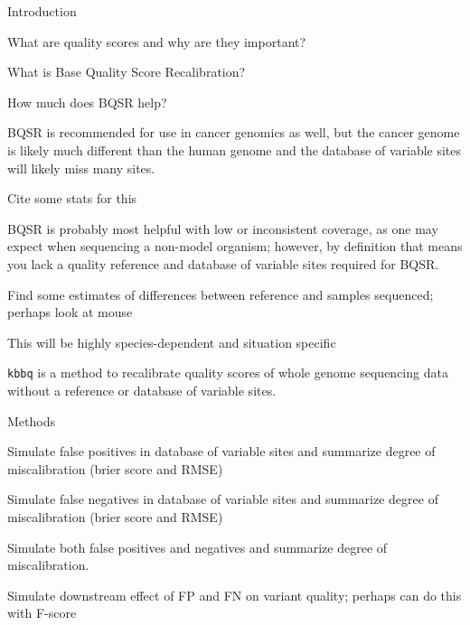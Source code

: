\documentclass{article}
\begin{document}
\linenumbers
\begin{outline}
	\item Introduction
	\begin{outline}
		\item What are quality scores and why are they important?
		\item What is Base Quality Score Recalibration?
		\item How much does BQSR help?
		\begin{outline}
			\item BQSR is recommended for use in cancer genomics as well, but the cancer genome is likely much different than the human genome and the database of variable sites will likely miss many sites.
			\begin{outline}
				\item Cite some stats for this
			\end{outline}
		\end{outline}
		\item BQSR is probably most helpful with low or inconsistent coverage, as one may expect when sequencing a non-model organism; however, by definition that means you lack a quality reference and database of variable sites required for BQSR.
			\begin{outline}
				\item Find some estimates of differences between reference and samples sequenced; perhaps look at mouse
				\item This will be highly species-dependent and situation specific
			\end{outline}
		\item \texttt{kbbq} is a method to recalibrate quality scores of whole genome sequencing data without a reference or database of variable sites.
	\end{outline}
	\item Methods
	\begin{outline}
		\item Simulate false positives in database of variable sites and summarize degree of miscalibration (brier score and RMSE)
		\item Simulate false negatives in database of variable sites and summarize degree of miscalibration (brier score and RMSE)
		\item Simulate both false positives and negatives and summarize degree of miscalibration.
		\item Simulate downstream effect of FP and FN on variant quality; perhaps can do this with F-score

\end{outline}
\end{outline}
\end{document}
